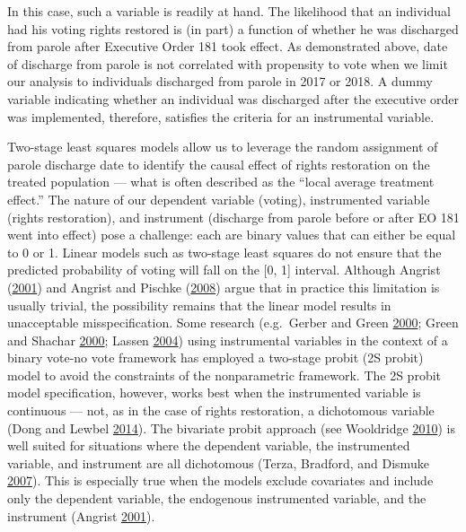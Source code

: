 \documentclass[
  12pt,
]{article}
\begin{document}
In this case, such a variable is readily at hand. The likelihood that an individual had his voting rights restored is (in part) a function of whether he was discharged from parole after Executive Order 181 took effect. As demonstrated above, date of discharge from parole is not correlated with propensity to vote when we limit our analysis to individuals discharged from parole in 2017 or 2018. A dummy variable indicating whether an individual was discharged after the executive order was implemented, therefore, satisfies the criteria for an instrumental variable.

Two-stage least squares models allow us to leverage the random assignment of parole discharge date to identify the causal effect of rights restoration on the treated population --- what is often described as the ``local average treatment effect.'' The nature of our dependent variable (voting), instrumented variable (rights restoration), and instrument (discharge from parole before or after EO 181 went into effect) pose a challenge: each are binary values that can either be equal to 0 or 1. Linear models such as two-stage least squares do not ensure that the predicted probability of voting will fall on the {[}0, 1{]} interval. Although Angrist (\protect\hyperlink{ref-Angrist2001}{2001}) and Angrist and Pischke (\protect\hyperlink{ref-Angrist2008}{2008}) argue that in practice this limitation is usually trivial, the possibility remains that the linear model results in unacceptable misspecification. Some research (e.g.~Gerber and Green \protect\hyperlink{ref-Gerber2000}{2000}; Green and Shachar \protect\hyperlink{ref-Green2000}{2000}; Lassen \protect\hyperlink{ref-Lassen2004}{2004}) using instrumental variables in the context of a binary vote-no vote framework has employed a two-stage probit (2S probit) model to avoid the constraints of the nonparametric framework. The 2S probit model specification, however, works best when the instrumented variable is continuous --- not, as in the case of rights restoration, a dichotomous variable (Dong and Lewbel \protect\hyperlink{ref-Dong2014}{2014}). The bivariate probit approach (see Wooldridge \protect\hyperlink{ref-Wooldridge2010}{2010}) is well suited for situations where the dependent variable, the instrumented variable, and instrument are all dichotomous (Terza, Bradford, and Dismuke \protect\hyperlink{ref-Terza2007}{2007}). This is especially true when the models exclude covariates and include only the dependent variable, the endogenous instrumented variable, and the instrument (Angrist \protect\hyperlink{ref-Angrist2001}{2001}).
\end{document}
